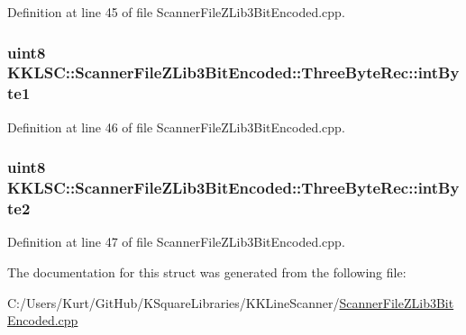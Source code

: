 Definition at line 45 of file Scanner\+File\+Z\+Lib3\+Bit\+Encoded.\+cpp.

\subsubsection[{\texorpdfstring{int\+Byte1}{intByte1}}]{\setlength{\rightskip}{0pt plus 5cm}uint8 K\+K\+L\+S\+C\+::\+Scanner\+File\+Z\+Lib3\+Bit\+Encoded\+::\+Three\+Byte\+Rec\+::int\+Byte1}\hypertarget{struct_scanner_file_z_lib3_bit_encoded_1_1_three_byte_rec_a139e021b8cd18a8f472e72f221ab16c9}{}\label{struct_scanner_file_z_lib3_bit_encoded_1_1_three_byte_rec_a139e021b8cd18a8f472e72f221ab16c9}


Definition at line 46 of file Scanner\+File\+Z\+Lib3\+Bit\+Encoded.\+cpp.

\subsubsection[{\texorpdfstring{int\+Byte2}{intByte2}}]{\setlength{\rightskip}{0pt plus 5cm}uint8 K\+K\+L\+S\+C\+::\+Scanner\+File\+Z\+Lib3\+Bit\+Encoded\+::\+Three\+Byte\+Rec\+::int\+Byte2}\hypertarget{struct_scanner_file_z_lib3_bit_encoded_1_1_three_byte_rec_a560d7834042684c35d5c21cdcf52f0ad}{}\label{struct_scanner_file_z_lib3_bit_encoded_1_1_three_byte_rec_a560d7834042684c35d5c21cdcf52f0ad}


Definition at line 47 of file Scanner\+File\+Z\+Lib3\+Bit\+Encoded.\+cpp.



The documentation for this struct was generated from the following file\+:\begin{DoxyCompactItemize}
\item 
C\+:/\+Users/\+Kurt/\+Git\+Hub/\+K\+Square\+Libraries/\+K\+K\+Line\+Scanner/\hyperlink{_scanner_file_z_lib3_bit_encoded_8cpp}{Scanner\+File\+Z\+Lib3\+Bit\+Encoded.\+cpp}\end{DoxyCompactItemize}
